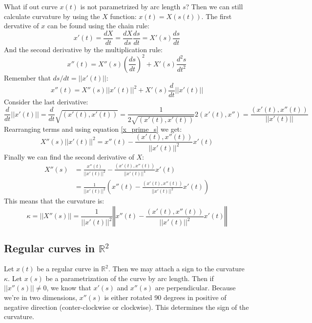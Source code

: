 \documentclass[12pt, a4paper]{article}
\numberwithin{equation}{section}
\begin{document}
What if out curve $x(t)$ is not parametrized by arc length $s$? Then we can still calculate curvature by using the $X$ function: $x(t)=X(s(t))$. The first dervative of $x$ can be found using the chain rule:
\begin{equation}
x'(t)=\frac{dX}{dt}=\frac{dX}{ds}\frac{ds}{dt}=X'(s)\frac{ds}{dt}
\end{equation}
And the second derivative by the multiplication rule:
\begin{equation}
x''(t)=X''(s)\left(\frac{ds}{dt}\right)^2+X'(s)\frac{d^2s}{dt^2}
\end{equation}
Remember that $ds/dt=||x'(t)||$:
\begin{equation}
x''(t)=X''(s)||x'(t)||^2+X'(s)\frac{d}{dt}||x'(t)||
\end{equation}
Consider the last derivative:
\begin{equation}
\frac{d}{dt}||x'(t)||=\frac{d}{dt}\sqrt{(x'(t),x'(t))}=\frac{1}{2\sqrt{(x'(t),x'(t))}}2(x'(t),x'')=\frac{(x'(t),x''(t))}{||x'(t)||}
\end{equation}
Rearranging terms and using equation \ref{x_prime_s} we get:
\begin{equation}
X''(s)||x'(t)||^2=x''(t)-\frac{(x'(t),x''(t))}{||x'(t)||^2}x'(t)
\end{equation}
Finally we can find the second derivative of $X$:
\begin{align}
X''(s)&=\frac{x''(t)}{||x'(t)||^2}-\frac{(x'(t),x''(t))}{||x'(t)||^4}x'(t)\\
&=\frac{1}{||x'(t)||^2}\left(x''(t)-\frac{(x'(t),x''(t))}{||x'(t)||^2}x'(t)\right)
\end{align}
This means that the curvature is:
\begin{equation}
\kappa=||X''(s)||=\frac{1}{||x'(t)||^2}\left\Vert x''(t)-\frac{(x'(t),x''(t))}{||x'(t)||^2}x'(t)\right\Vert
\end{equation}

\subsection{Regular curves in $\mathbb{R}^2$}
Let $x(t)$ be a regular curve in $\mathbb{R}^2$. Then we may attach a sign to the curvature $\kappa$. Let $x(s)$ be a parametrization of the curve by arc length. Then if $||x''(s)||\neq 0$, we know that $x'(s)$ and $x''(s)$ are perpendicular. Because we're in two dimensions, $x''(s)$ is either rotated 90 degrees in positive of negative direction (conter-clockwise or clockwise). This determines the sign of the curvature.
\end{document}
